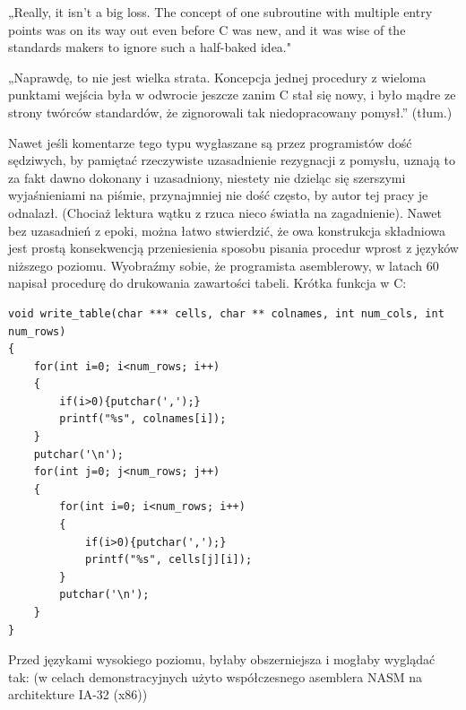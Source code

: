 „Really, it isn't a big loss. The concept of one subroutine with multiple entry points was on its way out even before C was new, and it was wise of the standards makers to ignore such a half-baked idea."\cite{delreth_on_entry}

„Naprawdę, to nie jest wielka strata. Koncepcja jednej procedury z wieloma punktami wejścia była w odwrocie jeszcze zanim C stał się nowy, i było mądre ze strony twórców standardów, że zignorowali tak niedopracowany pomysł.” (tłum.)
 
Nawet jeśli komentarze tego typu wygłaszane są przez programistów dość sędziwych, by pamiętać rzeczywiste uzasadnienie rezygnacji z pomysłu, uznają to za fakt dawno dokonany i uzasadniony, niestety nie dzieląc się szerszymi wyjaśnieniami na piśmie, przynajmniej nie dość często, by autor tej pracy je odnalazł. (Chociaż lektura wątku z \cite{delreth_on_entry} rzuca nieco światła na zagadnienie).
Nawet bez uzasadnień z epoki, można łatwo stwierdzić, że owa konstrukcja składniowa jest prostą konsekwencją przeniesienia sposobu pisania procedur wprost z języków niższego poziomu. Wyobraźmy sobie, że programista asemblerowy, w latach 60 napisał procedurę do drukowania zawartości tabeli. Krótka funkcja w C:

\begin{lstlisting}
void write_table(char *** cells, char ** colnames, int num_cols, int num_rows)
{
    for(int i=0; i<num_rows; i++)
    {
        if(i>0){putchar(',');}
        printf("%s", colnames[i]);
    }
    putchar('\n');
    for(int j=0; j<num_rows; j++)
    {
        for(int i=0; i<num_rows; i++)
        {
            if(i>0){putchar(',');}
            printf("%s", cells[j][i]);
        }
        putchar('\n');
    }
}
\end{lstlisting}

Przed językami wysokiego poziomu, byłaby obszerniejsza i mogłaby wyglądać tak:
(w celach demonstracyjnych użyto współczesnego asemblera NASM na architekture IA-32 (x86))

